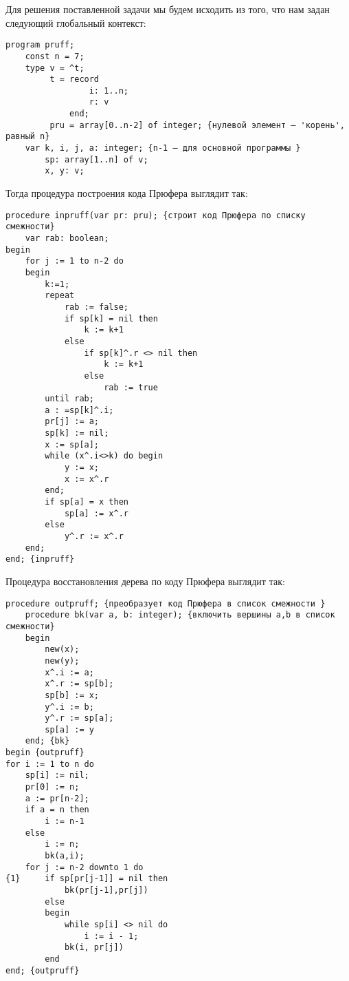 \documentclass[12pt,a4paper]{article}
\theoremstyle{plain}
\theoremstyle{definition}
\theoremstyle{remark}
\newtheorem*{comment}{Комментарий}
\begin{document}
Для решения поставленной задачи мы будем исходить из того, что нам задан следующий глобальный контекст:

\begin{verbatim}
program pruff;
    const n = 7;
    type v = ^t;
         t = record
                 i: 1..n;
                 r: v
             end;
         pru = array[0..n-2] of integer; {нулевой элемент – 'корень', равный n}
    var k, i, j, a: integer; {n-1 – для основной программы }
        sp: array[1..n] of v;
        x, y: v;
\end{verbatim}

Тогда процедура построения кода Прюфера выглядит так:

\begin{verbatim}
procedure inpruff(var pr: pru); {строит код Прюфера по списку смежности}
    var rab: boolean;
begin
    for j := 1 to n-2 do
    begin
        k:=1;
        repeat
            rab := false;
            if sp[k] = nil then
                k := k+1
            else
                if sp[k]^.r <> nil then
                    k := k+1
                else
                    rab := true
        until rab;
        a : =sp[k]^.i;
        pr[j] := a;
        sp[k] := nil;
        x := sp[a];
        while (x^.i<>k) do begin
            y := x;
            x := x^.r
        end;
        if sp[a] = x then
            sp[a] := x^.r
        else
            y^.r := x^.r
    end;
end; {inpruff}
\end{verbatim}

Процедура восстановления дерева по коду Прюфера выглядит так:

\begin{verbatim}
procedure outpruff; {преобразует код Прюфера в список смежности }
    procedure bk(var a, b: integer); {включить вершины a,b в список смежности}
    begin
        new(x);
        new(y);
        x^.i := a;
        x^.r := sp[b];
        sp[b] := x;
        y^.i := b;
        y^.r := sp[a];
        sp[a] := y
    end; {bk}
begin {outpruff}
for i := 1 to n do
    sp[i] := nil;
    pr[0] := n;
    a := pr[n-2];
    if a = n then
        i := n-1
    else
        i := n;
        bk(a,i);
    for j := n-2 downto 1 do
{1}     if sp[pr[j-1]] = nil then
            bk(pr[j-1],pr[j])
        else
        begin
            while sp[i] <> nil do
                i := i - 1;
            bk(i, pr[j])
        end
end; {outpruff}
\end{verbatim}

\begin{comment}
Нулевой элемент в описании типа \verb@pru@ введен для корректного вычисления, в случае $j=1$, логического выражения в условии оператора \verb@{1}@. В массиве \verb@pr@, используемого процедурой \verb@outpruff@ в качестве значения кода Прюфера, нулевому элементу присвоено значение равное $n$.
\end{comment}
\end{document}
